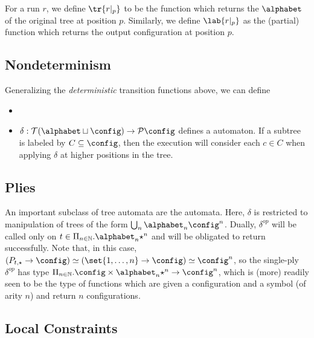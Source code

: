 For a run $r$, we define $\tr{r|_p}$ to be the function which returns the
$\alphabet$ of the original tree at position $p$.  Similarly, we define
$\lab{r|_p}$ as the (partial) function which returns the output
configuration at position $p$.

\subsection{Nondeterminism}


Generalizing the {\em deterministic} transition functions above, we can
define
%
\begin{itemize}
%
  \item 
%
  \item $\delta : \mathcal{T}(\alphabet \sqcup \config) \to \mathcal{P}\config$
defines a  automaton.  If a subtree is
labeled by $C \subseteq \config$, then the execution will consider each $c
\in C$ when applying $\delta$ at higher positions in the tree.
%
\end{itemize}

\subsection{Plies}

An important subclass of tree automata are the  automata.
Here, $\delta$ is restricted to manipulation of trees of the form
$\bigcup_{n} \alphabet_n \config^n$.  Dually, $\delta^{op}$ will be called
only on $t \in \Pi_{n \in \mathbb{N}} . \alphabet_n \star^n$ and will be
obligated to return successfully.  Note that, in this case, $(P_{t,\star}
\to \config) \simeq (\set{1,\ldots,n} \to \config) \simeq \config^n$, so the
single-ply $\delta^{op}$ has type $\Pi_{n \in \mathbb{N}} . \config \times
\alphabet_n \star^n \to \config^n$, which is (more) readily seen to be the
type of functions which are given a configuration and a symbol (of arity
$n$) and return $n$ configurations.

% 

\subsection{Local Constraints}
\label{sec:treeaut:con:loc}

